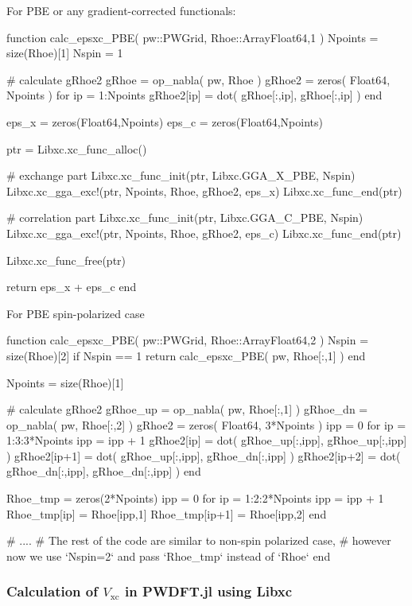 For PBE or any gradient-corrected functionals:
\begin{juliacode}
function calc_epsxc_PBE( pw::PWGrid, Rhoe::Array{Float64,1} )
  Npoints = size(Rhoe)[1]
  Nspin = 1

  # calculate gRhoe2
  gRhoe = op_nabla( pw, Rhoe )
  gRhoe2 = zeros( Float64, Npoints )
  for ip = 1:Npoints
    gRhoe2[ip] = dot( gRhoe[:,ip], gRhoe[:,ip] )
  end

  eps_x = zeros(Float64,Npoints)
  eps_c = zeros(Float64,Npoints)

  ptr = Libxc.xc_func_alloc()

  # exchange part
  Libxc.xc_func_init(ptr, Libxc.GGA_X_PBE, Nspin)
  Libxc.xc_gga_exc!(ptr, Npoints, Rhoe, gRhoe2, eps_x)
  Libxc.xc_func_end(ptr)

  # correlation part
  Libxc.xc_func_init(ptr, Libxc.GGA_C_PBE, Nspin)
  Libxc.xc_gga_exc!(ptr, Npoints, Rhoe, gRhoe2, eps_c)
  Libxc.xc_func_end(ptr)

  Libxc.xc_func_free(ptr)

  return eps_x + eps_c
end
\end{juliacode}

For PBE spin-polarized case

\begin{juliacode}
function calc_epsxc_PBE( pw::PWGrid, Rhoe::Array{Float64,2} )
  Nspin = size(Rhoe)[2]
  if Nspin == 1
    return calc_epsxc_PBE( pw, Rhoe[:,1] )
  end

  Npoints = size(Rhoe)[1]

  # calculate gRhoe2
  gRhoe_up = op_nabla( pw, Rhoe[:,1] )
  gRhoe_dn = op_nabla( pw, Rhoe[:,2] )
  gRhoe2 = zeros( Float64, 3*Npoints )
  ipp = 0
  for ip = 1:3:3*Npoints
    ipp = ipp + 1
    gRhoe2[ip]   = dot( gRhoe_up[:,ipp], gRhoe_up[:,ipp] )
    gRhoe2[ip+1] = dot( gRhoe_up[:,ipp], gRhoe_dn[:,ipp] )
    gRhoe2[ip+2] = dot( gRhoe_dn[:,ipp], gRhoe_dn[:,ipp] )
  end

  Rhoe_tmp = zeros(2*Npoints)
  ipp = 0
  for ip = 1:2:2*Npoints
    ipp = ipp + 1
    Rhoe_tmp[ip] = Rhoe[ipp,1]
    Rhoe_tmp[ip+1] = Rhoe[ipp,2]
  end

  # ....
  # The rest of the code are similar to non-spin polarized case,
  # however now we use `Nspin=2` and pass `Rhoe_tmp` instead of `Rhoe`
end
\end{juliacode}


\subsubsection{Calculation of $V_{\mathrm{xc}}$ in \textsf{PWDFT.jl} using Libxc}

